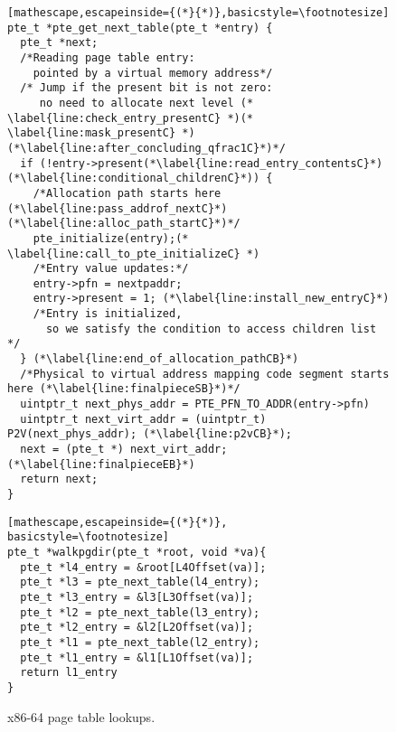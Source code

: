 \begin{figure}
\begin{subfigure}
\begin{tikzpicture}[x=0.75pt,y=0.75pt,yscale=-0.75,xscale=0.75]
\end{tikzpicture}
          \caption{Accessing to the Page Referenced by L1 Entry}
        \label{fig:enter-label}
    \end{subfigure}
    \vfill
\begin{minipage}{.5\textwidth}
\begin{lstlisting}[mathescape,escapeinside={(*}{*)},basicstyle=\footnotesize]
pte_t *pte_get_next_table(pte_t *entry) {
  pte_t *next;
  /*Reading page table entry:
    pointed by a virtual memory address*/
  /* Jump if the present bit is not zero:
     no need to allocate next level (* \label{line:check_entry_presentC} *)(* \label{line:mask_presentC} *)  (*\label{line:after_concluding_qfrac1C}*)*/
  if (!entry->present(*\label{line:read_entry_contentsC}*) (*\label{line:conditional_childrenC}*)) {
    /*Allocation path starts here (*\label{line:pass_addrof_nextC}*)(*\label{line:alloc_path_startC}*)*/
    pte_initialize(entry);(* \label{line:call_to_pte_initializeC} *)
    /*Entry value updates:*/
    entry->pfn = nextpaddr;
    entry->present = 1; (*\label{line:install_new_entryC}*)
    /*Entry is initialized,
      so we satisfy the condition to access children list */
  } (*\label{line:end_of_allocation_pathCB}*)
  /*Physical to virtual address mapping code segment starts here (*\label{line:finalpieceSB}*)*/
  uintptr_t next_phys_addr = PTE_PFN_TO_ADDR(entry->pfn)
  uintptr_t next_virt_addr = (uintptr_t) P2V(next_phys_addr); (*\label{line:p2vCB}*);
  next = (pte_t *) next_virt_addr;(*\label{line:finalpieceEB}*)
  return next;
}
\end{lstlisting}
\end{minipage}
\begin{minipage}{.4\textwidth}
\begin{lstlisting}[mathescape,escapeinside={(*}{*)}, basicstyle=\footnotesize]
pte_t *walkpgdir(pte_t *root, void *va){ 
  pte_t *l4_entry = &root[L4Offset(va)];
  pte_t *l3 = pte_next_table(l4_entry);
  pte_t *l3_entry = &l3[L3Offset(va)];
  pte_t *l2 = pte_next_table(l3_entry);
  pte_t *l2_entry = &l2[L2Offset(va)];  
  pte_t *l1 = pte_next_table(l2_entry);
  pte_t *l1_entry = &l1[L1Offset(va)];  
  return l1_entry
}
\end{lstlisting}
\end{minipage}
    \vspace{-2.5em}
    \caption{x86-64 page table lookups.}
    \label{fig:pagetables}
    \vspace{-1em}
\end{figure}

